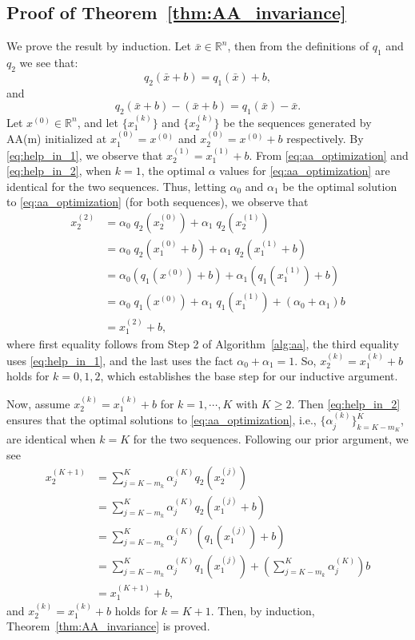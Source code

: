 \documentclass[11pt]{article}
\newcommand{\R}{\mathbb{R}}
\begin{document}
{{{\subsection{Proof of Theorem~\ref{thm:AA_invariance}} We prove the result by induction. 
Let $\bar{x}\in \R^n$, then from the definitions of $q_1$ and $q_2$ we see that:
\begin{equation}\label{eq:help_in_1}
q_2(\bar{x}+b)  
= q_1(\bar{x}) + b, 
\end{equation}
and
\begin{equation}\label{eq:help_in_2}
q_2(\bar{x} + b) - (\bar{x} +b) = q_1(\bar{x}) - \bar{x}. 
\end{equation}
Let $x^{(0)}\in \R^n$, and let $\{x_1^{(k)}\}$ and $\{x_2^{(k)}\}$ be the sequences generated by AA(m) initialized at $x_1^{(0)} = x^{(0)}$ and $x_2^{(0)} = x^{(0)}+b$ respectively. By \eqref{eq:help_in_1}, we observe  that $x_2^{(1)} = x_1^{(1)} + b$.
From \eqref{eq:aa_optimization} and \eqref{eq:help_in_2},  when $k=1$, the optimal $\alpha$ values for \eqref{eq:aa_optimization} are  identical for the two sequences. 
Thus, letting $\alpha_0$ and $\alpha_1$ be the optimal solution to \eqref{eq:aa_optimization} (for both sequences), we observe that 
\begin{align}
x_2^{(2)} &= \alpha_0\; q_2(x_2^{(0)}) + \alpha_1\; q_2(x_2^{(1)}) \nonumber \\
&= \alpha_0\; q_2(x_1^{(0)} +b) + \alpha_1\;  q_2(x_1^{(1)}+b) \nonumber \\
&= \alpha_0\left( q_1(x^{(0)}) + b\right) + \alpha_1 \left( q_1(x_1^{(1)}) + b \right) \nonumber \\
&=\alpha_0\; q_1(x^{(0)}) + \alpha_1\; q_1(x_1^{(1)}) + (\alpha_0 + \alpha_1)b  \nonumber \\
&= x_1^{(2)} + b, \nonumber 
\end{align}
where first equality follows from Step 2 of Algorithm~\ref{alg:aa}, the third equality uses \eqref{eq:help_in_1}, and the last uses the fact $\alpha_0 + \alpha_1 = 1$. 
So, $x_2^{(k)} = x_1^{(k)} + b$ holds for $k=0,1,2$, which establishes the base step for our inductive argument. 


Now, assume $x_2^{(k)} = x_1^{(k)} + b$ for $k=1,\cdots,K$ with $K\geq 2$. Then \eqref{eq:help_in_2} ensures that the optimal solutions to \eqref{eq:aa_optimization}, i.e., $\{\alpha_j^{(k)}\}_{k=K-m_K}^K$, are identical when $k=K$ for the two sequences. 
Following our prior argument, we see 
\begin{align}
x_2^{(K+1)}&= \sum_{j=K-m_k}^{K} \alpha_j^{(K)}q_2(x_2^{(j)}) \nonumber \\ 
&= \sum_{j=K-m_k}^{K} \alpha_j^{(K)}q_2(x_1^{(j)}+b) \nonumber \\
&= \sum_{j=K-m_k}^{K} \alpha_j^{(K)}(q_1(x_1^{(j)}) + b) \nonumber \\
&= \sum_{j=K-m_k}^{K} \alpha_j^{(K)}q_1(x_1^{(j)}) + \left( \sum_{j=K-m_k}^{K} \alpha_j^{(K)}\right)b \nonumber \\
&=x_1^{(K+1)} + b,\nonumber 
\end{align}
and $x_2^{(k)} = x_1^{(k)} + b$ holds for $k=K+1$. Then, by induction,  Theorem~\ref{thm:AA_invariance} is proved.
}

}}
\end{document}
